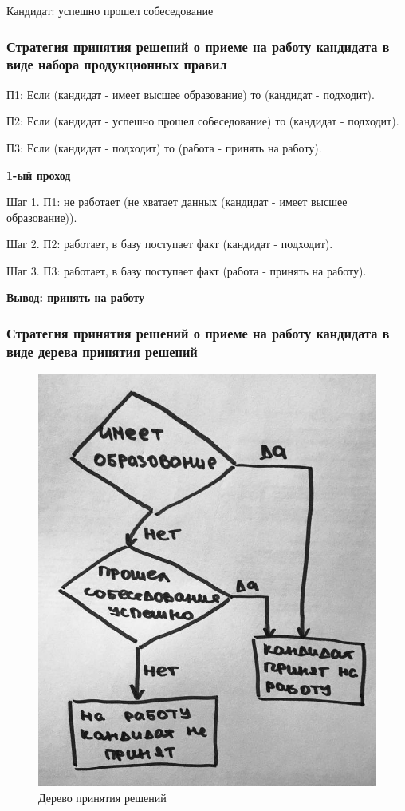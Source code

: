 \documentclass[14pt,a4paper,report]{report}
\begin{document}
Кандидат: успешно прошел собеседование

\subsubsection{Стратегия принятия решений о приеме на работу кандидата в виде набора продукционных правил}


П1: Если (кандидат - имеет высшее образование) то (кандидат - подходит).

П2: Если (кандидат - успешно прошел собеседование) то (кандидат - подходит).

П3: Если (кандидат - подходит) то (работа - принять на работу).

\textbf{1-ый проход}

Шаг 1. П1: не работает (не хватает данных (кандидат - имеет высшее образование)).

Шаг 2. П2: работает, в базу поступает факт (кандидат - подходит).

Шаг 3. П3: работает, в базу поступает факт (работа - принять на работу).

\textbf{Вывод: принять на работу}

\subsubsection{Стратегия принятия решений о приеме на работу кандидата в виде дерева принятия решений}

\begin{figure}[h!]
\centering
\includegraphics[scale = 0.40]{images/tree.jpg}
\caption{Дерево принятия решений}
\label{image:2}
\end{figure}
\end{document}
